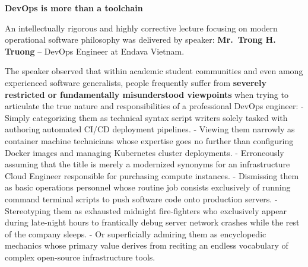 \vspace{0.5em}\noindent\textbf{DevOps is more than a
toolchain}\par

An intellectually rigorous and highly corrective lecture focusing on
modern operational software philosophy was delivered by speaker:
\textbf{Mr.~Trong H. Truong} -- DevOps Engineer at Endava Vietnam.

The speaker observed that within academic student communities and even
among experienced software generalists, people frequently suffer from
\textbf{severely restricted or fundamentally misunderstood viewpoints}
when trying to articulate the true nature and responsibilities of a
professional DevOps engineer: - Simply categorizing them as technical
syntax script writers solely tasked with authoring automated CI/CD
deployment pipelines. - Viewing them narrowly as container machine
technicians whose expertise goes no further than configuring Docker
images and managing Kubernetes cluster deployments. - Erroneously
assuming that the title is merely a modernized synonyms for an
infrastructure Cloud Engineer responsible for purchasing compute
instances. - Dismissing them as basic operations personnel whose routine
job consists exclusively of running command terminal scripts to push
software code onto production servers. - Stereotyping them as exhausted
midnight fire-fighters who exclusively appear during late-night hours to
frantically debug server network crashes while the rest of the company
sleeps. - Or superficially admiring them as encyclopedic mechanics whose
primary value derives from reciting an endless vocabulary of complex
open-source infrastructure tools.

